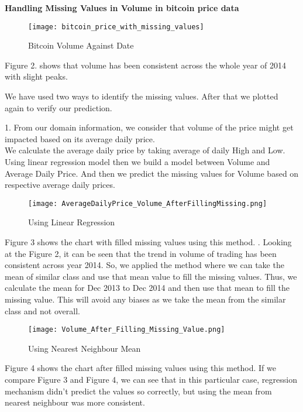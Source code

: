 \documentclass{article}
\begin{document}
\textbf
{Handling Missing Values in Volume in bitcoin price data}


\begin{figure}
    \centering
    \texttt{[image: bitcoin\_price\_with\_missing\_values]}
    \caption{Bitcoin Volume Against Date}
    \label{fig:my_label}
\end{figure}

Figure 2. shows that volume has been consistent across the whole year of 2014 with slight peaks.

We have used two ways to identify the missing values. After that we plotted again to verify our prediction.

1. From our domain information, we consider that volume of the price might get impacted based on its average daily price.\\

We calculate the average daily price by taking average of daily High and Low. Using linear regression model then we build a model between Volume and Average Daily Price. And then we predict the missing values for Volume based on respective average daily prices.\newline

\begin{figure}
    \centering
    \texttt{[image: AverageDailyPrice\_Volume\_AfterFillingMissing.png]}
    \caption{Using Linear Regression}
    \label{fig:my_label}
\end{figure}

Figure 3 shows the chart with filled missing values using this method.
. Looking at the Figure 2, it can be seen that the trend in volume of trading has been consistent across year 2014. So, we applied the method where we can take the mean of similar class and use that mean value to fill the missing values.
Thus, we calculate the mean for Dec 2013 to Dec 2014 and then use that mean to fill the missing value.
This will avoid any biases as we take the mean from the similar class and not overall.\\
\begin{figure}
    \centering
    \texttt{[image: Volume\_After\_Filling\_Missing\_Value.png]}
    \caption{Using Nearest Neighbour Mean}
    \label{fig:my_label}
\end{figure}
Figure 4 shows the chart after filled missing values using this method.\newline
If we compare Figure 3 and Figure 4, we can see that in this particular case, regression mechanism
didn't predict the values so correctly, but using the mean from nearest neighbour was more consistent.\\
\end{document}
